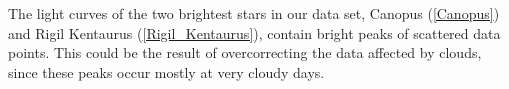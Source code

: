 \documentclass{aa}
\begin{document}

    

The light curves of the two brightest stars in our data set, Canopus (\ref{Canopus}) and Rigil Kentaurus (\ref{Rigil_Kentaurus}), contain bright peaks of scattered data points. This could be the result of overcorrecting the data affected by clouds, since these peaks occur mostly at very cloudy days.
\end{document}
